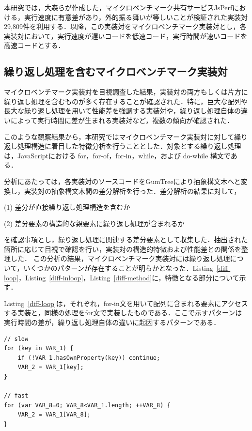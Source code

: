 \documentclass[submit,techrep,noauthor]{ipsj}
\newcommand{\todo}[1]{\colorbox{yellow}{{\bf TODO}:}{\color{red} {\textbf{[#1]}}}}
\begin{document}
本研究では，大森ら\cite{omori}が作成した，マイクロベンチマーク共有サービスJsPerfにおける，実行速度に有意差があり，外的振る舞いが等しいことが検証された実装対29,809件を利用する．以降，この実装対をマイクロベンチマーク実装対とし，各実装対において，実行速度が遅いコードを低速コード，実行時間が速いコードを高速コードとする．

\subsection{繰り返し処理を含むマイクロベンチマーク実装対}
\label{section3.1}


マイクロベンチマーク実装対を目視調査した結果，実装対の両方もしくは片方に繰り返し処理を含むものが多く存在することが確認された．特に，巨大な配列や長大な繰り返し処理を用いて性能差を強調する実装対や，繰り返し処理自体の違いによって実行時間に差が生まれる実装対など，複数の傾向が確認された．

このような観察結果から，本研究ではマイクロベンチマーク実装対に対して繰り返し処理構造に着目した特徴分析を行うこととした．対象とする繰り返し処理は，JavaScriptにおける for，for-of，for-in，while，および do-while 構文である．

分析にあたっては，各実装対のソースコードをGumTree\cite{gumtree}により抽象構文木へと変換し，実装対の抽象構文木間の差分解析を行った．差分解析の結果に対して，

(1) 差分が直接繰り返し処理構造を含むか

(2) 差分要素の構造的な親要素に繰り返し処理が含まれるか

を確認事項とし，繰り返し処理に関連する差分要素として収集した．抽出された箇所に応じて目視で確認を行い，実装対の構造的特徴および性能差との関係を整理した．
この分析の結果，マイクロベンチマーク実装対には繰り返し処理について，いくつかのパターンが存在することが明らかとなった．Listing~\ref{diff-loop}，Listing~\ref{diff-inloop}，Listing~\ref{diff-method}に，特徴となる部分について示す．

Listing~\ref{diff-loop}は，それぞれ，for-in文を用いて配列に含まれる要素にアクセスする実装と，同様の処理をfor文で実装したものである．ここで示すパターンは実行時間の差が，繰り返し処理自体の違いに起因するパターンである．
\begin{lstlisting}[caption=Pairs with loop differences, label=diff-loop, captionpos=t, columns=flexible]
// slow
for (key in VAR_1) {
    if (!VAR_1.hasOwnProperty(key)) continue;
    VAR_2 = VAR_1[key];
}

// fast
for (var VAR_8=0; VAR_8<VAR_1.length; ++VAR_8) {
    VAR_2 = VAR_1[VAR_8];
}
\end{lstlisting}
\end{document}
